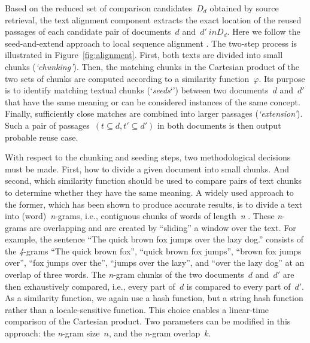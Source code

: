 \documentclass[fleqn,10pt]{wlscirep}
\begin{document}
Based on the reduced set of comparison candidates~$D_d$ obtained by source retrieval, the text alignment component extracts the exact location of the reused passages of each candidate pair of documents~$d$ and~$d'\ in D_d$. Here we follow the seed-and-extend approach to local sequence alignment \cite{potthast:2012b}. The two-step process is illustrated in Figure~\ref{fig:alignment}. First, both texts are divided into small chunks (\emph{`chunking'}). Then, the matching chunks in the Cartesian product of the two sets of chunks are computed according to a similarity function~$\varphi$. Its purpose is to identify matching textual chunks (`\textit{seeds}`') between two documents~$d$ and~$d'$ that have the same meaning or can be considered instances of the same concept. Finally, sufficiently close matches are combined into larger passages (\emph{`extension'}). Such a pair of passages~$(t \subseteq d, t' \subseteq d')$ in both documents is then output probable reuse case.

With respect to the chunking and seeding steps, two methodological decisions must be made. First, how to divide a given document into small chunks. And second, which similarity function should be used to compare pairs of text chunks to determine whether they have the same meaning. A widely used approach to the former, which has been shown to produce accurate results, is to divide a text into (word)~\emph{n}-grams, i.e., contiguous chunks of words of length~\emph{n} \cite{stamatatos:2011,citron:2015}. These \emph{n}-grams are overlapping and are created by ``sliding'' a window over the text. For example, the sentence ``The quick brown fox jumps over the lazy dog.'' consists of the \emph{4}-grams ``The quick brown fox'', ``quick brown fox jumps'', ``brown fox jumps over'', ``fox jumps over the'', ``jumps over the lazy'', and ``over the lazy dog'' at an overlap of three words. The  \emph{n}-gram chunks of the two documents~$d$ and~$d'$ are then exhaustively compared, i.e., every part of~$d$ is compared to every part of~$d'$. As a similarity function, we again use a hash function, but a string hash function rather than a locale-sensitive function. This choice enables a linear-time comparison of the Cartesian product. Two parameters can be modified in this approach: the \emph{n}-gram size~$n$, and the \emph{n}-gram overlap~$k$.
\end{document}
